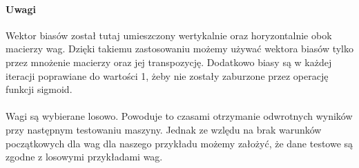     \paragraph{Uwagi}
	 Wektor biasów został tutaj umieszczony wertykalnie oraz horyzontalnie obok macierzy wag. 
	 Dzięki takiemu zastosowaniu możemy używać wektora biasów tylko przez mnożenie macierzy oraz jej transpozycję.
	 Dodatkowo biasy są w każdej iteracji poprawiane do wartości 1, żeby nie zostały zaburzone przez operację funkcji sigmoid.
    \paragraph{}
	 Wagi są wybierane losowo. Powoduje to czasami otrzymanie odwrotnych wyników przy następnym testowaniu maszyny.
	 Jednak ze wzlędu na brak warunków początkowych dla wag dla naszego przykładu możemy założyć, że dane testowe są zgodne z 			 losowymi przykładami wag.
	 